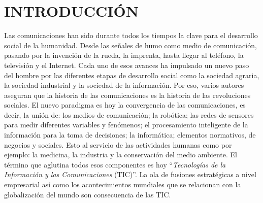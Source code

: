 \chapter*{\centering INTRODUCCIÓN}
\label{Cap:Introduccion}



Las comunicaciones han sido durante todos los tiempos la clave para el desarrollo social de la humanidad. Desde las señales de humo como medio de comunicación, pasando por la invención de la rueda, la imprenta, hasta llegar al teléfono, la televisión y el Internet. Cada uno de esos avances ha impulsado un nuevo paso del hombre por las diferentes etapas de desarrollo social como la sociedad agraria, la sociedad industrial y la sociedad de la información. Por eso, varios autores aseguran que la historia de las comunicaciones es la historia de las revoluciones sociales. El nuevo paradigma es hoy la convergencia de las comunicaciones, es decir, la unión de: los medios de comunicación; la robótica; las redes de sensores para medir diferentes variables y fenómenos; el procesamiento inteligente de la información para la toma de decisiones; la informática; elementos normativos, de negocios y sociales. Esto al servicio de las actividades humanas como por ejemplo: la medicina, la industria y la conservación del medio ambiente. El término que aglutina todos esos componentes es hoy “\textit{Tecnologías de la Información y las Comunicaciones} (TIC)”. La ola de fusiones estratégicas a nivel empresarial así como los acontecimientos mundiales que se relacionan con la globalización del mundo son consecuencia de las TIC.
\\

